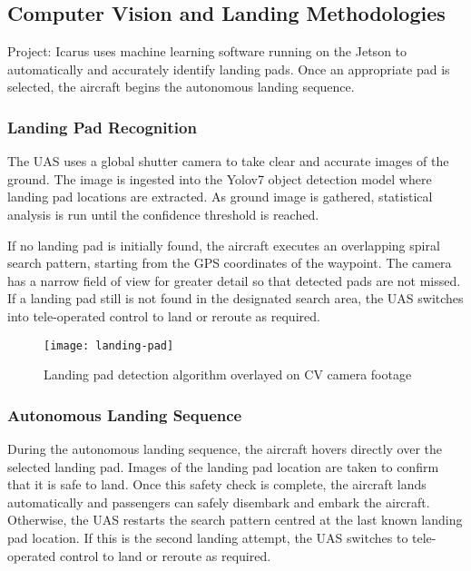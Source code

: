 \subsection{Computer Vision and Landing Methodologies}
\label{sec:cv-and-landing}

Project: Icarus uses machine learning software running on the Jetson to
automatically and accurately identify landing pads. Once an appropriate pad is
selected, the aircraft begins the autonomous landing sequence.

\subsubsection{Landing Pad Recognition}

The UAS uses a global shutter camera to take clear and accurate images of the
ground. The image is ingested into the Yolov7 object detection model where
landing pad locations are extracted. As ground image is gathered, statistical
analysis is run until the confidence threshold is reached.

If no landing pad is initially found, the aircraft executes an overlapping
spiral search pattern, starting from the GPS coordinates of the waypoint. The
camera has a narrow field of view for greater detail so that detected pads are
not missed. If a landing pad still is not found in the designated search area,
the UAS switches into tele-operated control to land or reroute as required.

\begin{figure}[H]
        \centering
        \texttt{[image: landing-pad]}
		\caption{Landing pad detection algorithm overlayed on CV camera
		footage}
\end{figure}

\clearpage

\subsubsection{Autonomous Landing Sequence}
\label{sec:landing-sequence}

During the autonomous landing sequence, the aircraft hovers directly over the
selected landing pad. Images of the landing pad location are taken to confirm
that it is safe to land. Once this safety check is complete, the aircraft lands
automatically and passengers can safely disembark and embark the aircraft.
Otherwise, the UAS restarts the search pattern centred at the last known
landing pad location. If this is the second landing attempt, the UAS switches
to tele-operated control to land or reroute as required.

